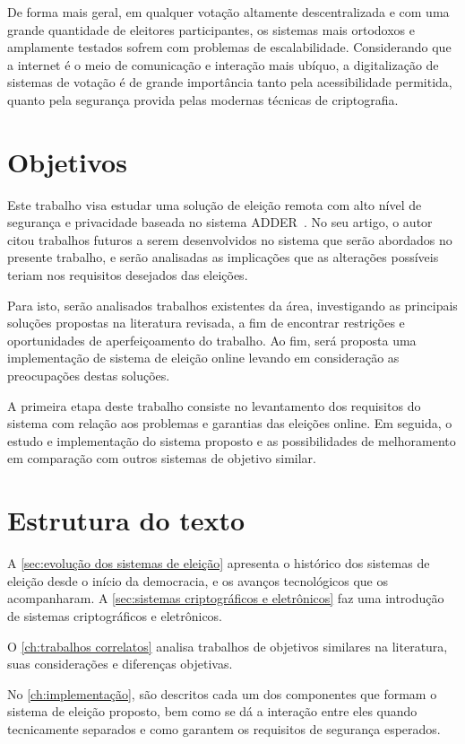 De forma mais geral, em qualquer votação altamente descentralizada e com uma
grande quantidade de eleitores participantes, os sistemas mais ortodoxos e
amplamente testados sofrem com problemas de escalabilidade. Considerando que a
internet é o meio de comunicação e interação mais ubíquo, a digitalização de
sistemas de votação é de grande importância tanto pela acessibilidade
permitida, quanto pela segurança provida pelas modernas técnicas de
criptografia.

\section{Objetivos}

Este trabalho visa estudar uma solução de eleição remota com alto nível de
segurança e privacidade baseada no sistema ADDER~\cite{kiayias2006internet}. No
seu artigo, o autor citou trabalhos futuros a serem desenvolvidos no sistema
que serão abordados no presente trabalho, e serão analisadas as implicações que
as alterações possíveis teriam nos requisitos desejados das eleições.

Para isto, serão analisados trabalhos existentes da área, investigando as
principais soluções propostas na literatura revisada, a fim de encontrar
restrições e oportunidades de aperfeiçoamento do trabalho. Ao fim, será
proposta uma implementação de sistema de eleição online levando em consideração
as preocupações destas soluções.

A primeira etapa deste trabalho consiste no levantamento dos requisitos do
sistema com relação aos problemas e garantias das eleições online. Em seguida,
o estudo e implementação do sistema proposto e as possibilidades de
melhoramento em comparação com outros sistemas de objetivo similar.

\section{Estrutura do texto}

A \autoref{sec:evolução dos sistemas de eleição} apresenta o histórico dos
sistemas de eleição desde o início da democracia, e os avanços tecnológicos que
os acompanharam. A \autoref{sec:sistemas criptográficos e eletrônicos} faz uma
introdução de sistemas criptográficos e eletrônicos.

O \autoref{ch:trabalhos correlatos} analisa trabalhos de objetivos similares na
literatura, suas considerações e diferenças objetivas.

No \autoref{ch:implementação}, são descritos cada um dos componentes que formam
o sistema de eleição proposto, bem como se dá a interação entre eles quando
tecnicamente separados e como garantem os requisitos de segurança esperados.
